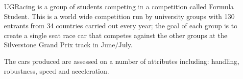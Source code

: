 \label{BG}
UGRacing is a group of students competing in a competition called Formula Student. This is a world wide competition run by university groups with 130 entrants from 34 countries \cite{formula_student} carried out every year; the goal of each group is to create a single seat race car that competes against the other groups at the Silverstone Grand Prix track in June/July. 

The cars produced are assessed on a number of attributes including: handling, robustness, speed and acceleration.
